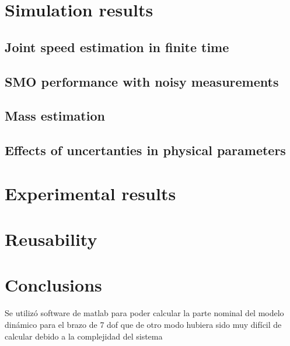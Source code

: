 \documentclass[a4paper, 10pt]{article}
\begin{document}
\section{Simulation results}
\subsection{Joint speed estimation in finite time}

\subsection{SMO performance with noisy measurements}

\subsection{Mass estimation}

\subsection{Effects of uncertanties in physical parameters}

\section{Experimental results}

\section{Reusability}

\section{Conclusions}
Se utilizó software de matlab para poder calcular la parte nominal del modelo dinámico para el brazo de 7 dof que de otro modo hubiera sido muy difícil de calcular debido a la complejidad del sistema



\end{document}
